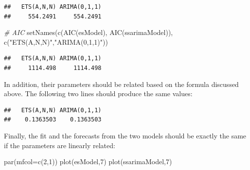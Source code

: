 \documentclass[
]{book}
\newenvironment{Shaded}{\begin{snugshade}}{\end{snugshade}}
\newcommand{\AttributeTok}[1]{\textcolor[rgb]{0.77,0.63,0.00}{#1}}
\newcommand{\CommentTok}[1]{\textcolor[rgb]{0.56,0.35,0.01}{\textit{#1}}}
\newcommand{\DecValTok}[1]{\textcolor[rgb]{0.00,0.00,0.81}{#1}}
\newcommand{\FunctionTok}[1]{\textcolor[rgb]{0.00,0.00,0.00}{#1}}
\newcommand{\NormalTok}[1]{#1}
\newcommand{\SpecialCharTok}[1]{\textcolor[rgb]{0.00,0.00,0.00}{#1}}
\newcommand{\StringTok}[1]{\textcolor[rgb]{0.31,0.60,0.02}{#1}}
\theoremstyle{definition}
\theoremstyle{definition}
\theoremstyle{definition}
\theoremstyle{definition}
\theoremstyle{remark}
\begin{document}
\begin{verbatim}
##   ETS(A,N,N) ARIMA(0,1,1) 
##     554.2491     554.2491
\end{verbatim}

\begin{Shaded}
\begin{Highlighting}[]
\CommentTok{\# AIC}
\FunctionTok{setNames}\NormalTok{(}\FunctionTok{c}\NormalTok{(}\FunctionTok{AIC}\NormalTok{(esModel), }\FunctionTok{AIC}\NormalTok{(ssarimaModel)),}
         \FunctionTok{c}\NormalTok{(}\StringTok{"ETS(A,N,N)"}\NormalTok{,}\StringTok{"ARIMA(0,1,1)"}\NormalTok{))}
\end{Highlighting}
\end{Shaded}

\begin{verbatim}
##   ETS(A,N,N) ARIMA(0,1,1) 
##     1114.498     1114.498
\end{verbatim}

In addition, their parameters should be related based on the formula discussed above. The following two lines should produce the same values:

\begin{Shaded}
\end{Shaded}

\begin{verbatim}
##   ETS(A,N,N) ARIMA(0,1,1) 
##    0.1363503    0.1363503
\end{verbatim}

Finally, the fit and the forecasts from the two models should be exactly the same if the parameters are linearly related:

\begin{Shaded}
\begin{Highlighting}[]
\FunctionTok{par}\NormalTok{(}\AttributeTok{mfcol=}\FunctionTok{c}\NormalTok{(}\DecValTok{2}\NormalTok{,}\DecValTok{1}\NormalTok{))}
\FunctionTok{plot}\NormalTok{(esModel,}\DecValTok{7}\NormalTok{)}
\FunctionTok{plot}\NormalTok{(ssarimaModel,}\DecValTok{7}\NormalTok{)}
\end{Highlighting}
\end{Shaded}
\end{document}

